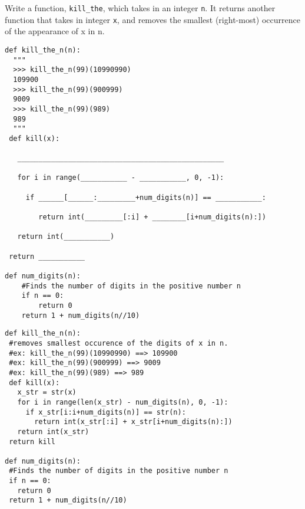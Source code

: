 \begin{blocksection}
\question Write a function, \texttt{kill\_the}, which takes in an integer \texttt{n}. It returns another function that takes in integer \texttt{x}, and removes the smallest (right-most) occurrence of the appearance of x in n.

\begin{lstlisting}
def kill_the_n(n):
  """
  >>> kill_the_n(99)(10990990)
  109900
  >>> kill_the_n(99)(900999)
  9009
  >>> kill_the_n(99)(989)
  989
  """
 def kill(x):
 
   _________________________________________________
   
   for i in range(___________ - ___________, 0, -1):
   
     if ______[______:_________+num_digits(n)] == ___________:
     
        return int(_________[:i] + ________[i+num_digits(n):])
       
   return int(___________)
   
 return ___________

def num_digits(n):
    #Finds the number of digits in the positive number n
    if n == 0:
        return 0
    return 1 + num_digits(n//10)

\end{lstlisting}

\begin{solution}
\begin{lstlisting}
def kill_the_n(n):
 #removes smallest occurence of the digits of x in n.
 #ex: kill_the_n(99)(10990990) ==> 109900
 #ex: kill_the_n(99)(900999) ==> 9009
 #ex: kill_the_n(99)(989) ==> 989
 def kill(x):
   x_str = str(x)
   for i in range(len(x_str) - num_digits(n), 0, -1):
     if x_str[i:i+num_digits(n)] == str(n):
       return int(x_str[:i] + x_str[i+num_digits(n):])
   return int(x_str)
 return kill

def num_digits(n):
 #Finds the number of digits in the positive number n
 if n == 0:
   return 0
 return 1 + num_digits(n//10)



\end{lstlisting}
\end{solution}
\end{blocksection}

